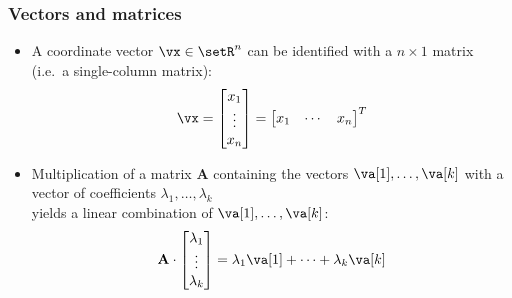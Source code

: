 \begin{frame}
  \frametitle{Vectors and matrices}

  \begin{itemize}
  \item A coordinate vector $\vx\in \setR^n$ can be identified with a $n\times
    1$ matrix (i.e.\ a single-column matrix):
    \[
    \vx =
    \begin{bmatrix}
      x_1 \\ \vdots \\ x_n
    \end{bmatrix}
    =
    \begin{bmatrix}
      x_1 & \cdots & x_n
    \end{bmatrix}^T
    \]
    \pause\ungap
  \item Multiplication of a matrix $\mathbf{A}$ containing the vectors $\va[1], \ldots,
    \va[k]$ with a vector of coefficients $\lambda_1, \ldots, \lambda_k$\\
    yields a linear combination of $\va[1], \ldots, \va[k]$:
    \[
    \mathbf{A}\cdot
    \begin{bmatrix}
      \lambda_1 \\ \vdots \\ \lambda_k
    \end{bmatrix}
    = \lambda_1 \va[1] + \cdots + \lambda_k \va[k]
    \]
  \end{itemize}
\end{frame}

